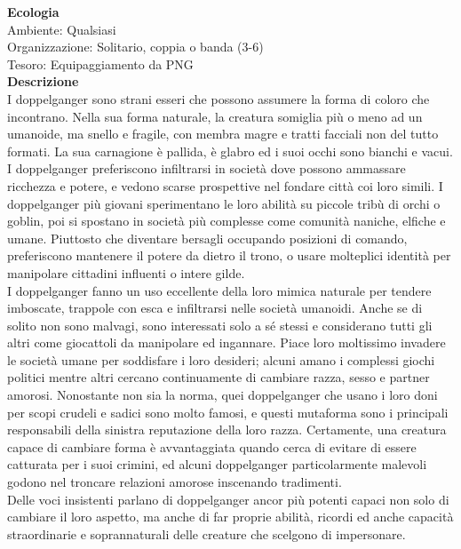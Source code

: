 \begin{multicols}{2}
\textbf{Ecologia}\\
Ambiente: Qualsiasi\\
Organizzazione: Solitario, coppia o banda (3-6)\\
Tesoro: Equipaggiamento da PNG\\
\textbf{Descrizione}\\
I doppelganger sono strani esseri che possono assumere la forma di coloro che incontrano. Nella sua forma naturale, la creatura somiglia più o meno ad un umanoide, ma snello e fragile, con membra magre e tratti facciali non del tutto formati. La sua carnagione è pallida, è glabro ed i suoi occhi sono bianchi e vacui.\\
I doppelganger preferiscono infiltrarsi in società dove possono ammassare ricchezza e potere, e vedono scarse prospettive nel fondare città coi loro simili. I doppelganger più giovani sperimentano le loro abilità su piccole tribù di orchi o goblin, poi si spostano in società più complesse come comunità naniche, elfiche e umane. Piuttosto che diventare bersagli occupando posizioni di comando, preferiscono mantenere il potere da dietro il trono, o usare molteplici identità per manipolare cittadini influenti o intere gilde.\\
I doppelganger fanno un uso eccellente della loro mimica naturale per tendere imboscate, trappole con esca e infiltrarsi nelle società umanoidi. Anche se di solito non sono malvagi, sono interessati solo a sé stessi e considerano tutti gli altri come giocattoli da manipolare ed ingannare. Piace loro moltissimo invadere le società umane per soddisfare i loro desideri; alcuni amano i complessi giochi politici mentre altri cercano continuamente di cambiare razza, sesso e partner amorosi. Nonostante non sia la norma, quei doppelganger che usano i loro doni per scopi crudeli e sadici sono molto famosi, e questi mutaforma sono i principali responsabili della sinistra reputazione della loro razza. Certamente, una creatura capace di cambiare forma è avvantaggiata quando cerca di evitare di essere catturata per i suoi crimini, ed alcuni doppelganger particolarmente malevoli godono nel troncare relazioni amorose inscenando tradimenti.\\

Delle voci insistenti parlano di doppelganger ancor più potenti capaci non solo di cambiare il loro aspetto, ma anche di far proprie abilità, ricordi ed anche capacità straordinarie e soprannaturali delle creature che scelgono di impersonare.\\



\end{multicols}
